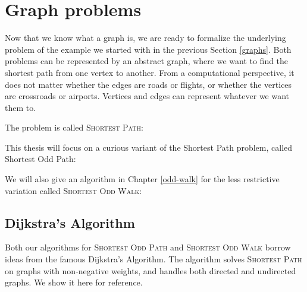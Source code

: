 \section{Graph problems}
\label{graph-problems}

Now that we know what a graph is, we are ready to formalize the underlying problem of the example we started with in the previous Section \ref{graphs}. Both problems can be represented by an abstract graph, where we want to find the shortest path from one vertex to another. From a computational perspective, it does not matter whether the edges are roads or flights, or whether the vertices are crossroads or airports. Vertices and edges can represent whatever we want them to. 

The problem is called \textsc{Shortest Path}:


This thesis will focus on a curious variant of the Shortest Path problem, called Shortest Odd Path:


We will also give an algorithm in Chapter \ref{odd-walk} for the less restrictive variation called \textsc{Shortest Odd Walk}:


\subsection{Dijkstra's Algorithm}
Both our algorithms for \textsc{Shortest Odd Path} and \textsc{Shortest Odd Walk} borrow ideas from the famous Dijkstra's Algorithm. The algorithm solves \textsc{Shortest Path} on graphs with non-negative weights, and handles both directed and undirected graphs. We show it here for reference.

